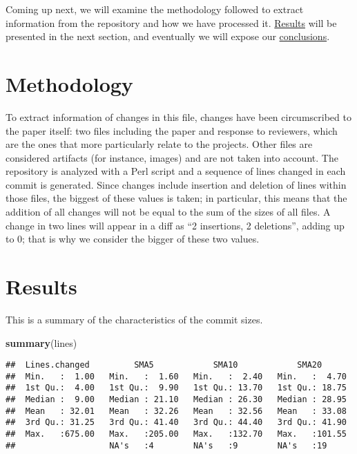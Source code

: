 \documentclass[]{article}
\newenvironment{Shaded}{\begin{snugshade}}{\end{snugshade}}
\newcommand{\KeywordTok}[1]{\textcolor[rgb]{0.13,0.29,0.53}{\textbf{{#1}}}}
\newcommand{\NormalTok}[1]{{#1}}
\begin{document}
Coming up next, we will examine the methodology followed to extract
information from the repository and how we have processed it.
\protect\hyperlink{res}{Results} will be presented in the next section,
and eventually we will expose our \protect\hyperlink{conc}{conclusions}.

\section{Methodology}\label{methodology}

To extract information of changes in this file, changes have been
circumscribed to the paper itself: two files including the paper and
response to reviewers, which are the ones that more particularly relate
to the projects. Other files are considered artifacts (for instance,
images) and are not taken into account. The repository is analyzed with
a Perl script and a sequence of lines changed in each commit is
generated. Since changes include insertion and deletion of lines within
those files, the biggest of these values is taken; in particular, this
means that the addition of all changes will not be equal to the sum of
the sizes of all files. A change in two lines will appear in a diff as
``2 insertions, 2 deletions'', adding up to 0; that is why we consider
the bigger of these two values.

\hypertarget{res}{\section{Results}\label{res}}

This is a summary of the characteristics of the commit sizes.

\begin{Shaded}
\begin{Highlighting}[]
\KeywordTok{summary}\NormalTok{(lines)}
\end{Highlighting}
\end{Shaded}

\begin{verbatim}
##  Lines.changed         SMA5            SMA10            SMA20       
##  Min.   :  1.00   Min.   :  1.60   Min.   :  2.40   Min.   :  4.70  
##  1st Qu.:  4.00   1st Qu.:  9.90   1st Qu.: 13.70   1st Qu.: 18.75  
##  Median :  9.00   Median : 21.10   Median : 26.30   Median : 28.95  
##  Mean   : 32.01   Mean   : 32.26   Mean   : 32.56   Mean   : 33.08  
##  3rd Qu.: 31.25   3rd Qu.: 41.40   3rd Qu.: 44.40   3rd Qu.: 41.90  
##  Max.   :675.00   Max.   :205.00   Max.   :132.70   Max.   :101.55  
##                   NA's   :4        NA's   :9        NA's   :19
\end{verbatim}
\end{document}
